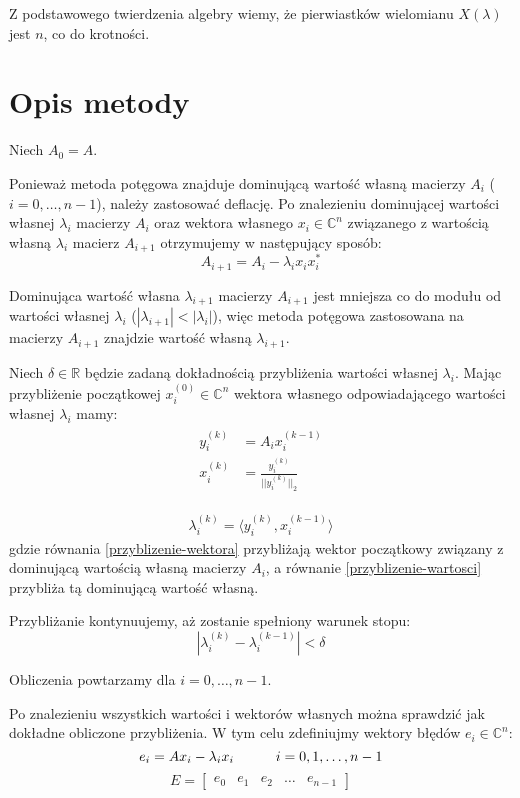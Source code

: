 \documentclass[12pt]{article}
\begin{document}
	Z podstawowego twierdzenia algebry wiemy, że pierwiastków wielomianu $X(\lambda)$ jest $n$, co do krotności.
	
	
	\section{Opis metody}
	Niech $A_0 = A$.
	
	Ponieważ metoda potęgowa znajduje dominującą wartość własną macierzy $A_i$ ($i = 0, \dots, n-1$), należy zastosować deflację. Po znalezieniu dominującej wartości własnej $\lambda_i$ macierzy $A_i$ oraz wektora własnego $x_i \in \mathbb{C}^n$ związanego z wartością własną $\lambda_i$ macierz $A_{i+1}$ otrzymujemy w następujący sposób:
	$$ A_{i+1} = A_i - \lambda_i x_i x_i^* $$
	
	Dominująca wartość własna $\lambda_{i+1}$ macierzy $A_{i+1}$ jest mniejsza co do modułu od wartości własnej $\lambda_i$ ($|\lambda_{i+1}| < |\lambda_i|$), więc metoda potęgowa zastosowana na macierzy $A_{i+1}$ znajdzie wartość własną $\lambda_{i+1}$.
	
	Niech $\delta \in \mathbb{R}$ będzie zadaną dokładnością przybliżenia wartości własnej $\lambda_i$. Mając przybliżenie początkowej $x_i^{(0)} \in \mathbb{C}^n$ wektora własnego odpowiadającego wartości własnej $\lambda_i$ mamy:
	\begin{align}
		\begin{split}
			\label{przyblizenie-wektora}
			y_i^{(k)}       & = A_i x_i^{(k-1)} \\
			x_i^{(k)}       & = \frac{y_i^{(k)}}{|| y_i^{(k)} ||_2}
		\end{split}
	\end{align}

	\begin{align}
		\label{przyblizenie-wartosci}
		\lambda_i^{(k)} = \langle y_i^{(k)}, x_i^{(k-1)} \rangle
	\end{align}
	gdzie równania \eqref{przyblizenie-wektora} przybliżają wektor początkowy związany z dominującą wartością własną macierzy $A_i$, a równanie \eqref{przyblizenie-wartosci} przybliża tą dominującą wartość własną.
	
	Przybliżanie kontynuujemy, aż zostanie spełniony warunek stopu:
	$$ | \lambda_i^{(k)} - \lambda_i^{(k-1)} | < \delta $$
	
	Obliczenia powtarzamy dla $i = 0, \dots, n-1$.
	
	Po znalezieniu wszystkich wartości i wektorów własnych można sprawdzić jak dokładne obliczone przybliżenia. W tym celu zdefiniujmy wektory błędów $e_i \in \mathbb{C}^n$:
	$$e_i = A x_i - \lambda_i x_i \hspace{30px} i = 0, 1, \dots, n-1$$
	\begin{equation*}
		E = 
		\begin{bmatrix}
			e_0 & e_1 & e_2 & \dots & e_{n-1}
		\end{bmatrix}
	\end{equation*}
	
\end{document}
